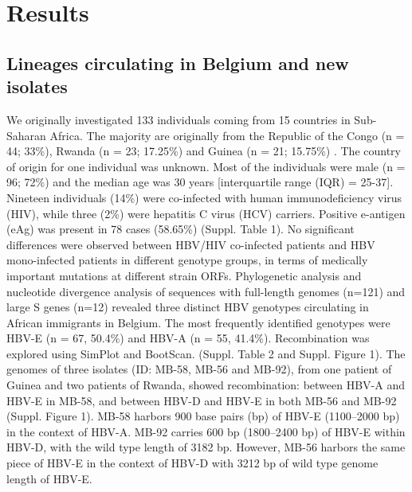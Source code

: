 \section{Results}
\subsection{Lineages circulating in Belgium and new isolates}
We originally investigated 133 individuals coming from 15 countries in Sub-Saharan Africa. The majority are originally from the Republic of the Congo (n = 44; 33\%), Rwanda (n = 23; 17.25\%) and Guinea (n = 21; 15.75\%) . The country of origin for one individual was unknown. Most of the individuals were male (n = 96; 72\%) and the median age was 30 years [interquartile range (IQR) = 25-37]. Nineteen individuals (14\%) were co-infected with human immunodeficiency virus (HIV), while three (2\%) were hepatitis C virus (HCV) carriers. Positive e-antigen (eAg) was present in 78 cases (58.65\%) (Suppl. Table 1). No significant differences were observed between HBV/HIV co-infected patients and HBV mono-infected patients in different genotype groups, in terms of medically important mutations at different strain ORFs.
Phylogenetic analysis and nucleotide divergence analysis of sequences with full-length genomes (n=121) and large S genes (n=12) revealed three distinct HBV genotypes circulating in African immigrants in Belgium. The most frequently identified genotypes were HBV-E (n = 67, 50.4\%) and HBV-A (n = 55, 41.4\%).  Recombination was explored using SimPlot and BootScan. (Suppl. Table 2 and  Suppl. Figure 1). The genomes of three isolates (ID: MB-58, MB-56 and MB-92), from one patient of Guinea and two patients of Rwanda, showed recombination: between HBV-A and HBV-E in MB-58, and between HBV-D and HBV-E in both MB-56 and MB-92 (Suppl. Figure 1). MB-58 harbors 900 base pairs (bp) of HBV-E (1100--2000 bp) in the context of HBV-A. MB-92 carries 600 bp (1800--2400 bp) of HBV-E within HBV-D, with the wild type length of 3182 bp. However, MB-56 harbors the same piece of HBV-E in the context of HBV-D with 3212 bp of wild type genome length of HBV-E. 

